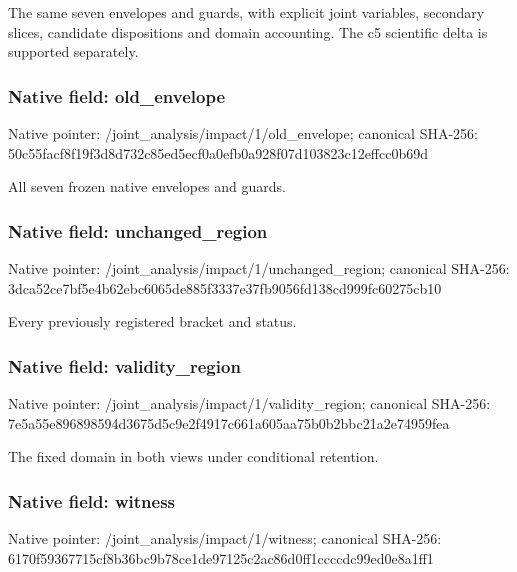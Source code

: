 \documentclass[10pt,a4paper]{article}
\begin{document}
\begingroup\raggedright\sloppy The same seven envelopes and guards,\allowbreak{} with explicit joint variables,\allowbreak{} secondary slices,\allowbreak{} candidate dispositions and domain accounting. The c5 scientific delta is supported separately.\par\endgroup

\subsubsection{Native field: old\_\allowbreak{}envelope}
Native pointer: /joint\_\allowbreak{}analysis/impact/1/old\_\allowbreak{}envelope; canonical SHA-256: 50c55facf8f19f3d8d732c85ed5ecf0a0efb0a928f07d103823c12effcc0b69d

\begingroup\raggedright\sloppy All seven frozen native envelopes and guards.\par\endgroup

\subsubsection{Native field: unchanged\_\allowbreak{}region}
Native pointer: /joint\_\allowbreak{}analysis/impact/1/unchanged\_\allowbreak{}region; canonical SHA-256: 3dca52ce7bf5e4b62ebc6065de885f3337e37fb9056fd138cd999fc60275cb10

\begingroup\raggedright\sloppy Every previously registered bracket and status.\par\endgroup

\subsubsection{Native field: validity\_\allowbreak{}region}
Native pointer: /joint\_\allowbreak{}analysis/impact/1/validity\_\allowbreak{}region; canonical SHA-256: 7e5a55e896898594d3675d5c9e2f4917c661a605aa75b0b2bbc21a2e74959fea

\begingroup\raggedright\sloppy The fixed domain in both views under conditional retention.\par\endgroup

\subsubsection{Native field: witness}
Native pointer: /joint\_\allowbreak{}analysis/impact/1/witness; canonical SHA-256: 6170f59367715cf8b36bc9b78ce1de97125c2ac86d0ff1ccccdc99ed0e8a1ff1
\end{document}
